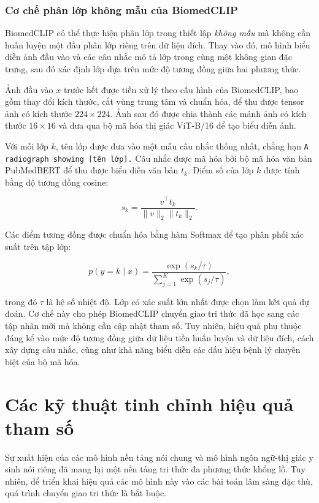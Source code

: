 \subsubsection{Cơ chế phân lớp không mẫu của BiomedCLIP}
\label{subsubsec:BiomedCLIP_zeroshot}

BiomedCLIP có thể thực hiện phân lớp trong thiết lập \textit{không mẫu} mà không cần huấn luyện một đầu phân lớp riêng trên dữ liệu đích. Thay vào đó, mô hình biểu diễn ảnh đầu vào và các câu nhắc mô tả lớp trong cùng một không gian đặc trưng, sau đó xác định lớp dựa trên mức độ tương đồng giữa hai phương thức.

Ảnh đầu vào $x$ trước hết được tiền xử lý theo cấu hình của BiomedCLIP, bao gồm thay đổi kích thước, cắt vùng trung tâm và chuẩn hóa, để thu được tensor ảnh có kích thước $224\times224$. Ảnh sau đó được chia thành các mảnh ảnh có kích thước $16\times16$ và đưa qua bộ mã hóa thị giác ViT-B/16 để tạo biểu diễn ảnh.

Với mỗi lớp $k$, tên lớp được đưa vào một mẫu câu nhắc thống nhất, chẳng hạn \texttt{A radiograph showing [tên lớp].} Câu nhắc được mã hóa bởi bộ mã hóa văn bản PubMedBERT để thu được biểu diễn văn bản $t_k$. Điểm số của lớp $k$ được tính bằng độ tương đồng cosine:

\begin{equation}
s_k =
\frac{v^\top t_k}
{\lVert v\rVert_2\lVert t_k\rVert_2}.
\end{equation}

Các điểm tương đồng được chuẩn hóa bằng hàm Softmax để tạo phân phối
xác suất trên tập lớp:

\begin{equation}
p(y=k\mid x)
=
\frac{\exp(s_k/\tau)}
{\sum_{j=1}^{K}\exp(s_j/\tau)},
\end{equation}

trong đó $\tau$ là hệ số nhiệt độ. Lớp có xác suất lớn nhất được chọn làm kết quả dự đoán. Cơ chế này cho phép BiomedCLIP chuyển giao tri thức đã học sang các tập nhãn mới mà không cần cập nhật tham số. Tuy nhiên, hiệu quả phụ thuộc đáng kể vào mức độ tương đồng giữa dữ liệu tiền huấn luyện và dữ liệu đích, cách xây dựng câu nhắc, cũng như khả năng biểu diễn các dấu hiệu bệnh lý chuyên biệt của bộ mã hóa.

\section{Các kỹ thuật tinh chỉnh hiệu quả tham số}

Sự xuất hiện của các mô hình nền tảng nói chung và mô hình ngôn ngữ-thị giác y sinh nói riêng đã mang lại một nền tảng tri thức đa phương thức khổng lồ. Tuy nhiên, để triển khai hiệu quả các mô hình này vào các bài toán lâm sàng đặc thù, quá trình chuyển giao tri thức là bắt buộc.


